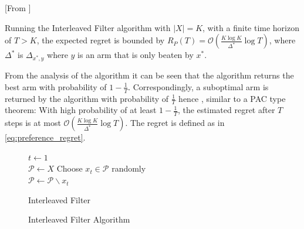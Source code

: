 \documentclass{llncs}
\begin{document}
	\begin{theorem}\label{thm:IF}[From \cite{...}]

		Running the Interleaved Filter algorithm with $|X|=K$, with a finite time horizon of $T>K$, the expected regret is bounded by $R_P(T) = \mathcal{O} \left( \frac{K\log K}{\Delta^*} \log T \right)$, where $\Delta^*$ is $\Delta_{x^*,y}$ where $y$ is an arm that is only beaten by $x^*$.

	\end{theorem}
	From the analysis of the algorithm it can be seen that the algorithm returns the best arm with probability of $1-\frac{1}{T}$.
	Correspondingly, a suboptimal arm is returned by the algorithm with probability of $\frac{1}{T}$ hence , similar to a PAC type theorem: With high probability of at least $1-\frac{1}{T}$, the estimated regret after $T$ steps is at most $\mathcal{O} \left( \frac{K\log K}{\Delta^*} \log T \right)$. The regret is defined as in \eqref{eq:preference_regret}.
	
	\begin{figure}[h]
	\IncMargin{1em}
		\begin{algorithm}[H]
		
			$ t\leftarrow 1$\\
			$ \mathcal{P} \leftarrow X$
			Choose $x_t \in \mathcal{P}$ randomly\\
			$ \mathcal{P} \leftarrow \mathcal{P} \backslash x_t$\\
			\BlankLine
			\caption{Interleaved Filter}
		\end{algorithm}
		\caption{Interleaved Filter Algorithm}\label{algo_IF}
	\end{figure}
	
\end{document}
